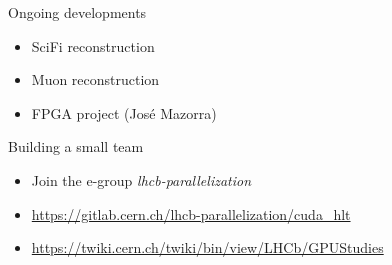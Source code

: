 \begin{frame}{Ongoing developments}
\begin{itemize}
\item SciFi reconstruction
\item Muon reconstruction
\item FPGA project (José Mazorra)
\end{itemize}

Building a small team
\begin{itemize}
\item Join the e-group \emph{lhcb-parallelization}
\item \url{https://gitlab.cern.ch/lhcb-parallelization/cuda_hlt}
\item \url{https://twiki.cern.ch/twiki/bin/view/LHCb/GPUStudies}
\end{itemize}
\end{frame}
